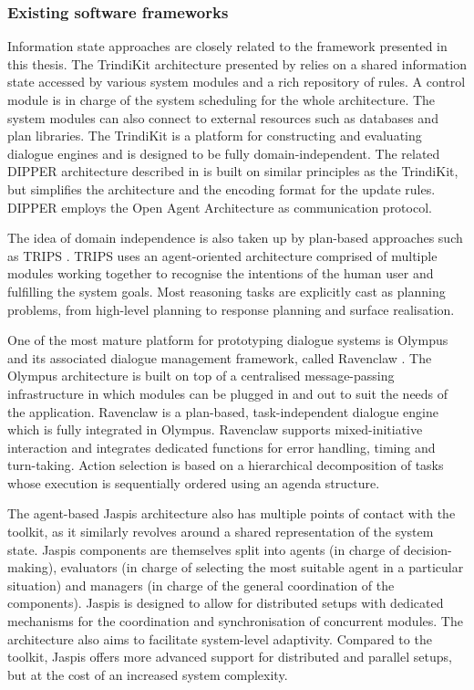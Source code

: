 \subsubsection*{Existing software frameworks}

Information state approaches are closely related to the framework presented in this thesis. The TrindiKit architecture presented by \cite{Larsson:2000} relies on a shared information state accessed by various system modules and a rich repository of rules. A control module is in charge of the system scheduling for the whole architecture. The system modules can also connect to external resources such as databases and plan libraries.   The TrindiKit is a platform for constructing and evaluating dialogue engines and is designed to be fully domain-independent. The related DIPPER architecture described in \cite{Bos2003} is built on similar principles as the TrindiKit, but simplifies the architecture and the encoding format for the  update rules.  DIPPER employs the Open Agent Architecture as communication protocol.

The idea of domain independence is also taken up by plan-based approaches such as TRIPS \citep[The Rochester Interactive Planning System, cf. ][]{Allen:2000:AGD:973935.973937}. TRIPS uses an agent-oriented architecture comprised of multiple modules working together to recognise the intentions of the human user and fulfilling the system goals.  Most reasoning tasks are explicitly cast as planning problems, from high-level planning to response planning and surface realisation.  

One of the most mature platform for prototyping dialogue systems is Olympus and its associated dialogue management framework, called Ravenclaw \citep{Bohus:2007,Bohus:2009}.  The Olympus architecture is built on top of a centralised message-passing infrastructure in which modules can be plugged in and out to suit the needs of the application.  Ravenclaw is a plan-based, task-independent dialogue engine which is fully integrated in Olympus.  Ravenclaw supports mixed-initiative interaction and integrates dedicated functions for error handling, timing and turn-taking. Action selection is based on a hierarchical decomposition of tasks whose execution is sequentially ordered using an agenda structure. 

The agent-based Jaspis architecture \citep{jaspis2004} also has multiple points of contact with the \opendial{} toolkit, as it similarly revolves around a shared representation of the system state.  Jaspis components are themselves split into agents (in charge of decision-making), evaluators (in charge of selecting the most suitable agent in a particular situation) and managers (in charge of the general coordination of the components). Jaspis is designed to allow for distributed setups with dedicated mechanisms for the coordination and synchronisation of concurrent modules.  The architecture also aims to facilitate system-level adaptivity.  Compared to the \opendial{} toolkit, Jaspis offers more advanced support for distributed and parallel setups, but at the cost of an increased system complexity.  


